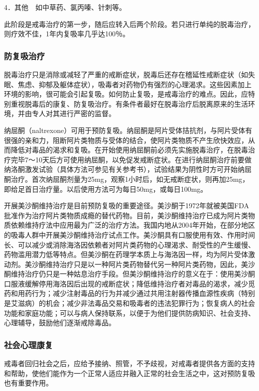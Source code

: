 4．其他　如中草药、氯丙嗪、针刺等。

此阶段是戒毒治疗的第一步，随后应转入后两个阶段。若只进行单纯的脱毒治疗，则疗效不佳，1年内复吸率几乎达100％。

\subsubsection{防复吸治疗}

脱毒治疗只是消除或减轻了严重的戒断症状，脱毒后还存在稽延性戒断症状（如失眠、焦虑、抑郁及躯体症状），吸毒者对药物仍有强烈的心理渴求。这些因素加上环境的影响，很可能会引起复吸。如何防止复吸，是戒毒治疗的难点。因此，应特别重视脱毒后的康复、防复吸治疗。有条件者最好在脱毒治疗后脱离原来的生活环境，并由专人对其进行严密的监督。

纳屈酮（naltrexone）可用于预防复吸。纳屈酮是阿片受体拮抗剂，与阿片受体有很强的亲和力，阻断阿片类物质与受体的结合，使阿片类物质不产生欣快效应，从而降低对毒品的渴求和复吸。在开始使用纳屈酮前必须先实施脱毒治疗，在脱毒治疗完毕7～10天后方可使用纳屈酮，以免促发戒断症状。在进行纳屈酮治疗前要做纳洛酮激发试验（具体方法可参见有关参考书），试验结果为阴性时方可开始纳屈酮治疗。首次纳屈酮剂量为25mg，观察1小时后，如无戒断症状，则再加25mg，即给足首日治疗量。以后使用方法可为每日50mg，或每日100mg。

开展美沙酮维持治疗是目前预防复吸的重要途径。美沙酮于1972年就被美国FDA批准作为治疗阿片类物质成瘾的替代药物。目前，美沙酮维持治疗已成为阿片类物质依赖维持疗法中应用最为广泛的治疗方法。我国内地从2004年开始，在部分地区的吸毒人群中开展美沙酮维持治疗试点工作。美沙酮具有口服使用有效、作用时间长、可以减少或消除海洛因依赖者对阿片类药物的心理渴求、耐受性的产生缓慢、药物滥用潜力低等特点。但美沙酮在药理学本质上与海洛因一样，均为阿片受体激动剂。美沙酮维持治疗只是以一种阿片类药物替代另一种阿片类药物，因此，美沙酮维持治疗仍只是一种姑息治疗手段。但美沙酮维持治疗的意义在于：使用美沙酮口服液缓解停用海洛因后出现的戒断症状；降低维持治疗者对毒品的渴求，减少觅药和用药行为；减少注射毒品的行为并减少通过共用注射器传播血源性疾病（特别是艾滋病）的机会；减少非法毒品交易和吸毒者的违法犯罪行为；恢复病人的社会功能和家庭功能；可以与病人保持联系，以便于为他们提供防病知识、社会支持、心理辅导，鼓励他们逐渐戒除毒品。

\subsubsection{社会心理康复}

戒毒者回归社会之后，应给予接纳、照管，不予歧视，对戒毒者提供各方面的支持和帮助，使他们能作为一个正常人适应并融入正常的社会生活之中，这对预防复吸也有重要作用。

